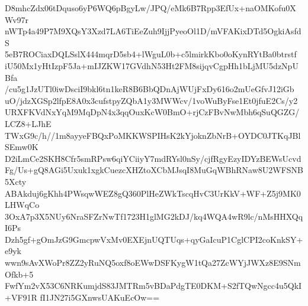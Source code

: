 D8mhcZdx06tDquso6yP6WQ6pBgyLw/JPQ/eMk6B7Rpp3EfUx+naOMKofu0XWv97r
nWTp4a49P7M9XQsY3Xzd7LA6TiEeZuh9IjjPyeoOl1D/mVFAKixDTd5OgkiAsfdS
5eB7ROCiaxDQLSslX444mqrD5sb4+lWguL0b+c5lmirkKbo0oKynRYtBa0btrstf
iU50Mx1yHtIzpF5Ja+mIJZKW17GVdhN53Ht2FM8sijqvCgpHh1bLjMU5dzNpUBfa
/cu5g1JzUTl0iwDsciI9bkl6tn1keR8B6BbQDnAjWUjFxDy616o2mUeGfvJ12iGb
uO/jdzXGSp2lfpE8A0x3cufstpyZQbA1y3MWWcv/1voWuByFse1Et0jfuE2Cs/y2
URXFKVdNxYqM9MqDpN4x3qqOuxKcW0BmO+rjCzFBvNwMbh6qSuQGZG/LCZ8+LJhE
TWxG9c/h//1m8ayyeFBQxPoMKKWSPIHsK2kYjoknZbNrB+OYDC0JTKqJBlSEmw0K
D2iLmCe2SKH8Cfr5smRPsw6qiYCiiyY7mdRYsl0nSy/cjfRgyEzyIDYzBEWsUcvd
Fg/Us+gQ8AGi5Uxuk1xgkCuezcXHZtoXCbMJsqI8MuGqWBhRNaw8U2WFSNB5Xcty
ABAkduj6gKhh4PWsqwWEZ8gQ360PlHeZWkTscqHvC3UrKkV+WF+Z5j9MK0LHWqCo
3OxA7p3X5NUy6NraSFZrNwTf1723H1glMG2kDJ/kq4WQA4wR9lc/nMsHHXQqI6Ps
Dzh5gf+gOmJzG9GmcpwVxMv0EXEjnUQTUqs+qyGaIcuP1CglCPI2coKnkSY+e9yk
wwn9sAvXWoPr8ZZ2yRuNQ5oxf8oEWwDSFKygW1tQa27ZcWYjJWXz8E9SNmOfkb+5
FwfYm2vX53C6NRKumjdS83JMTRm5vBDaPdgTE0DKM+S2fTQwNgcc4u5QkI+VF91R
fI1JN27i5GXnwsUAKuEcOw==
